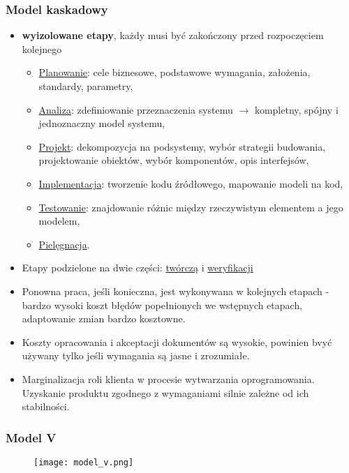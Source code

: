 \documentclass[a4paper]{article}
\begin{document}
    \subsubsection{Model kaskadowy}
    \begin{itemize}
        \item \textbf{wyizolowane etapy}, każdy musi być zakończony przed rozpoczęciem kolejnego
        \begin{itemize}
            \item \underline{Planowanie}: cele biznesowe, podstawowe wymagania, założenia, standardy, parametry,
            \item \underline{Analiza}: zdefiniowanie przeznaczenia systemu $\rightarrow$ kompletny, spójny i jednoznaczny model systemu,
            \item \underline{Projekt}: dekompozycja na podsystemy, wybór strategii budowania, projektowanie obiektów, wybór komponentów, opis interfejsów,
            \item \underline{Implementacja}: tworzenie kodu źródłowego, mapowanie modeli na kod,
            \item \underline{Testowanie}: znajdowanie różnic między rzeczywistym elementem a jego modelem,
            \item \underline{Pielęgnacja}.
        \end{itemize}
        \item Etapy podzielone na dwie części: \underline{twórczą} i \underline{weryfikacji}
        \item Ponowna praca, jeśli konieczna, jest wykonywana w kolejnych etapach - bardzo wysoki koszt błędów
        popełnionych we wstępnych etapach, adaptowanie zmian bardzo kosztowne.
        \item Koszty opracowania i akceptacji dokumentów są wysokie, powinien bvyć używany
        tylko jeśli wymagania są jasne i zrozumiałe.
        \item Marginalizacja roli klienta w procesie wytwarzania oprogramowania. Uzyskanie produktu zgodnego z wymaganiami
        silnie zależne od ich stabilności.
    \end{itemize}

    \subsubsection{Model V}
    \begin{figure}[H]
        \texttt{[image: model\_v.png]}
    \end{figure}
\end{document}
